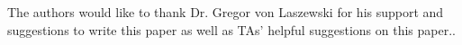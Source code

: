 \documentclass[sigconf]{acmart}
\begin{document}


\begin{acks}

  The authors would like to thank Dr. Gregor von Laszewski for his support and suggestions to write this paper as well as TAs' helpful suggestions on this paper.. 

\end{acks}


 
\end{document}
